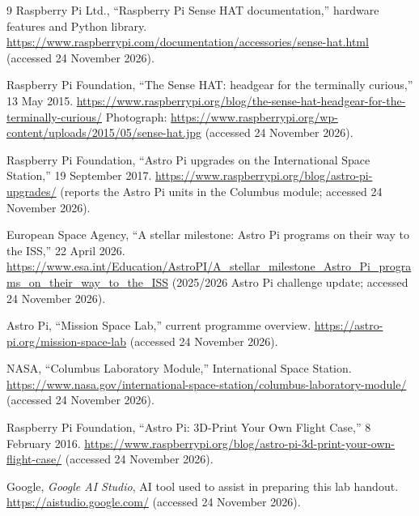 \documentclass[12pt]{article}
\begin{document}
\begin{thebibliography}{9}
\small
{}
Raspberry Pi Ltd., ``Raspberry Pi Sense HAT documentation,'' hardware features and Python library.
\url{https://www.raspberrypi.com/documentation/accessories/sense-hat.html}
(accessed 24 November 2026).

Raspberry Pi Foundation, ``The Sense HAT: headgear for the terminally curious,'' 13 May 2015.
\url{https://www.raspberrypi.org/blog/the-sense-hat-headgear-for-the-terminally-curious/}
Photograph:
\url{https://www.raspberrypi.org/wp-content/uploads/2015/05/sense-hat.jpg}
(accessed 24 November 2026).

Raspberry Pi Foundation, ``Astro Pi upgrades on the International Space Station,'' 19 September 2017.
\url{https://www.raspberrypi.org/blog/astro-pi-upgrades/}
(reports the Astro Pi units in the Columbus module; accessed 24 November 2026).

European Space Agency, ``A stellar milestone: Astro Pi programs on their way to the ISS,'' 22 April 2026.
\url{https://www.esa.int/Education/AstroPI/A_stellar_milestone_Astro_Pi_programs_on_their_way_to_the_ISS}
(2025/2026 Astro Pi challenge update; accessed 24 November 2026).

Astro Pi, ``Mission Space Lab,'' current programme overview.
\url{https://astro-pi.org/mission-space-lab}
(accessed 24 November 2026).

NASA, ``Columbus Laboratory Module,'' International Space Station.
\url{https://www.nasa.gov/international-space-station/columbus-laboratory-module/}
(accessed 24 November 2026).

Raspberry Pi Foundation, ``Astro Pi: 3D-Print Your Own Flight Case,'' 8 February 2016.
\url{https://www.raspberrypi.org/blog/astro-pi-3d-print-your-own-flight-case/}
(accessed 24 November 2026).

Google, \emph{Google AI Studio}, AI tool used to assist in preparing this lab handout.
\url{https://aistudio.google.com/} (accessed 24 November 2026).
\end{thebibliography}
\end{document}
